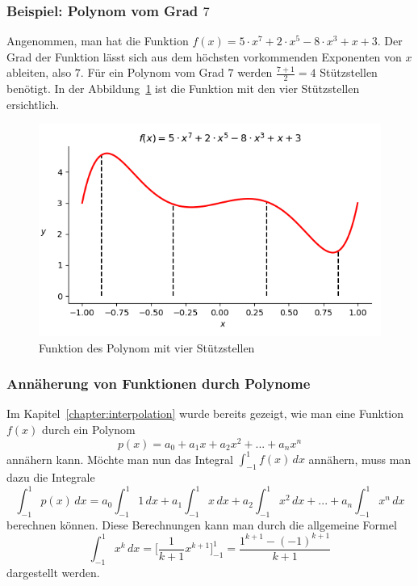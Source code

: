 \subsubsection{Beispiel: Polynom vom Grad $7$}
Angenommen, man hat die Funktion $f(x) = 5 \cdot x^{7} + 2 \cdot x^{5} - 8 \cdot x^{3} + x + 3$.
Der Grad der Funktion lässt sich aus dem höchsten vorkommenden Exponenten von $x$ ableiten,
also $7$.
Für ein Polynom vom Grad $7$ werden $\frac{7+1}{2} = 4$ Stützstellen benötigt.
In der Abbildung~\ref{quadratur:figure:polynom} ist die Funktion mit den vier 
Stützstellen ersichtlich.
\begin{figure}
    \centering
    \includegraphics[scale=0.7]{papers/quadratur/figures/polynom.png}
    \caption{ Funktion des Polynom mit vier Stützstellen
    \label{quadratur:figure:polynom}}
\end{figure}

\subsubsection{Annäherung von Funktionen durch Polynome}
Im Kapitel~\ref{chapter:interpolation} wurde bereits gezeigt, 
wie man eine Funktion $f(x)$ durch ein Polynom 
\begin{equation}
    p(x) = a_{0} + a_{1}x + a_{2}x^{2} + ... + a_{n}x^{n}
\end{equation}
annähern kann. Möchte man nun das Integral $\int_{-1}^{1} f(x) \, dx$ annähern, 
muss man dazu die Integrale 
\begin{equation}
    \int_{-1}^{1} p(x)\,dx 
    =
    a_{0} \int_{-1}^{1} 1\,dx
    +
    a_{1}\int_{-1}^{1} x\,dx 
    + 
    a_{2}\int_{-1}^{1} x^{2} \,dx  
    +
    ... 
    +
    a_{n}\int_{-1}^{1} x^{n}\,dx 
\end{equation}
berechnen können. Diese Berechnungen kann man durch die allgemeine Formel
\begin{equation}
    \int_{-1}^{1} x^{k}\,dx 
    = 
    \bigg[\frac{1}{k+1} x^{k+1}\bigg]_{-1}^{1}
    =
    \frac{1^{k+1} - (-1)^{k+1}}{k+1}  
\end{equation}
dargestellt werden.

